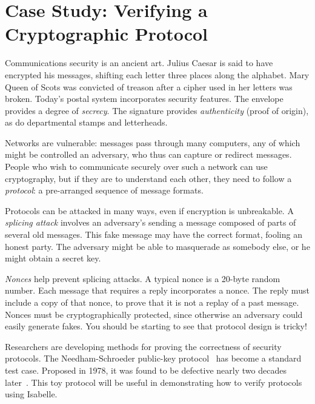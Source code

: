 \chapter{Case Study: Verifying a Cryptographic Protocol}
\label{chap:crypto}

\def\lbb{\mathopen{\{\kern-.30em|}}
\def\rbb{\mathclose{|\kern-.32em\}}}
\def\comp#1{\lbb#1\rbb}

Communications security is an ancient art.  Julius Caesar is said to have
encrypted his messages, shifting each letter three places along the
alphabet.  Mary Queen of Scots was convicted of treason after a cipher used
in her letters was broken.  Today's postal system incorporates security
features. The envelope provides a degree of
\emph{secrecy}.  The signature provides \emph{authenticity} (proof of
origin), as do departmental stamps and letterheads. 

Networks are vulnerable: messages pass through many computers, any of which
might be controlled an adversary, who thus can capture or redirect
messages.  People who wish to communicate securely over such a network can
use cryptography, but if they are to understand each other, they need to
follow a
\emph{protocol}: a pre-arranged sequence of message formats. 

Protocols can be attacked in many ways, even if encryption is unbreakable. 
A \emph{splicing attack} involves an adversary's sending a message composed
of parts of several old messages.  This fake message may have the correct
format, fooling an honest party.  The adversary might be able to masquerade
as somebody else, or he might obtain a secret key.

\emph{Nonces} help prevent splicing attacks. A typical nonce is a 20-byte
random number. Each message that requires a reply incorporates a nonce. The
reply must include a copy of that nonce, to prove that it is not a replay of
a past message.  Nonces must be cryptographically protected, since
otherwise an adversary could easily generate fakes. You should be starting
to see that protocol design is tricky!

Researchers are developing methods for proving the correctness of security
protocols.  The Needham-Schroeder public-key
protocol~\cite{needham-schroeder} has become a standard test case. 
Proposed in 1978, it was found to be defective nearly two decades
later~\cite{lowe-fdr}.  This toy protocol will be useful in demonstrating
how to verify protocols using Isabelle.


